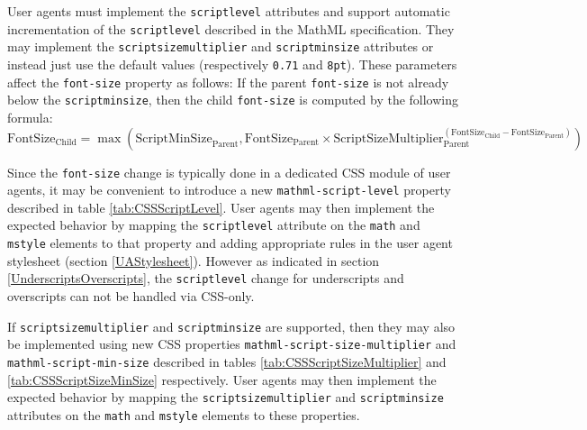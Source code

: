 User agents must implement the {\tt scriptlevel} attributes and support
automatic incrementation of the {\tt scriptlevel} described in the MathML
specification. They may implement the {\tt scriptsizemultiplier} and
{\tt scriptminsize} attributes or instead just use the default values
(respectively {\tt 0.71} and {\tt 8pt}). These parameters affect the
{\tt font-size} property as follows: If the parent
{\tt font-size} is not already below the {\tt scriptminsize}, then the
child {\tt font-size} is computed by the following formula:
%
\begin{equation}
\text{FontSize}_{\text{Child}} =
{\max \left(
  \text{ScriptMinSize}_{\text{Parent}},
  {\text{FontSize}_{\text{Parent}} \times
    {\text{ScriptSizeMultiplier}_{\text{Parent}}^
      {\left(\text{FontSize}_{\text{Child}} -
            \text{FontSize}_{\text{Parent}}\right)}
  }}
\right)}\label{eq:fontsize}
\end{equation}

Since the {\tt font-size} change is typically done in a dedicated CSS module of
user agents, it may be convenient to introduce a new
{\tt mathml-script-level} property described in table \ref{tab:CSSScriptLevel}.
User agents may then implement the expected behavior by mapping the
{\tt scriptlevel} attribute on the {\tt math} and {\tt mstyle} elements to that
property and adding appropriate rules in the user agent stylesheet
(section \ref{UAStylesheet}). However as indicated in section
\ref{UnderscriptsOverscripts}, the {\tt scriptlevel} change for underscripts
and overscripts can not be handled via CSS-only.

If {\tt scriptsizemultiplier} and {\tt scriptminsize}
are supported, then they may also be implemented using new CSS properties
{\tt mathml-script-size-multiplier} and {\tt mathml-script-min-size}
described in tables \ref{tab:CSSScriptSizeMultiplier} and
\ref{tab:CSSScriptSizeMinSize} respectively. User agents may then implement
the expected behavior by mapping the {\tt scriptsizemultiplier}
and {\tt scriptminsize} attributes on the {\tt math} and {\tt mstyle} elements
to these properties.

